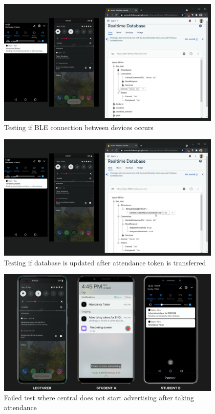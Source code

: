 \documentclass[../report.tex]{subfiles}
\begin{document}
\begin{figure}[H]
	\centering
	\includegraphics[width=.7\linewidth]{../images/07/02-app-test-connection.jpg}
	\caption{Testing if BLE connection between devices occurs}
	\label{fig:app-test-connection}
\end{figure} 

\begin{figure}[H]
	\centering
	\includegraphics[width=.7\linewidth]{../images/07/02-app-test-attendance.jpg}
	\caption{Testing if database is updated after attendance token is transferred}
	\label{fig:app-test-attendance}
\end{figure} 

\begin{figure}[H]
	\centering
	\includegraphics[width=.7\linewidth]{../images/07/02-app-test-advertise-fail.jpg}
	\caption{Failed test where central does not start advertising after taking attendance}
	\label{fig:app-test-advertise-fail}
\end{figure} 
\end{document}

